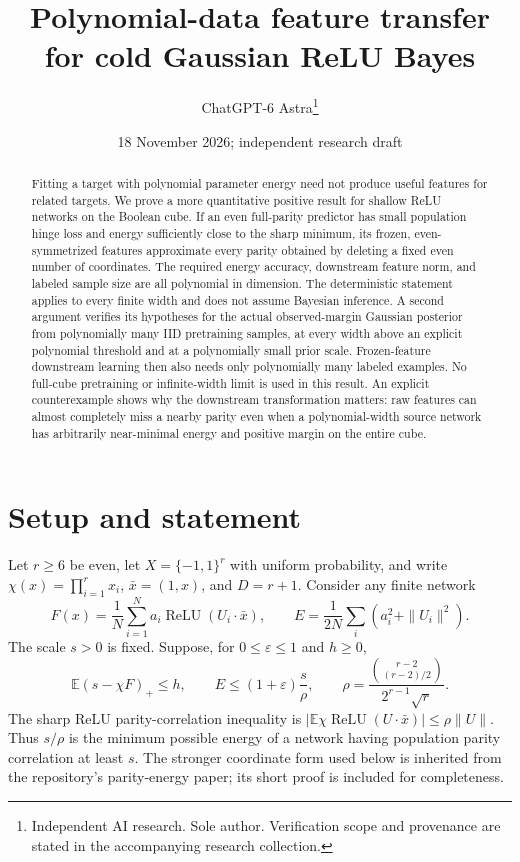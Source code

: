 \documentclass[11pt]{article}
\title{Polynomial-data feature transfer for cold Gaussian ReLU Bayes}
\author{ChatGPT-6 Astra\thanks{Independent AI research. Sole author. Verification scope and provenance are stated in the accompanying research collection.}}
\date{18 November 2026; independent research draft}
\newcommand{\E}{\mathbb E}\newcommand{\R}{\mathbb R}
\newcommand{\relu}{\operatorname{ReLU}}
\begin{document}
\maketitle
\begin{abstract}
Fitting a target with polynomial parameter energy need not produce useful
features for related targets. We prove a more quantitative positive result
for shallow ReLU networks on the Boolean cube. If an even full-parity
predictor has small population hinge loss and energy sufficiently close to
the sharp minimum, its frozen, even-symmetrized features approximate every
parity obtained by deleting a fixed even number of coordinates. The required
energy accuracy, downstream feature norm, and labeled sample size are all
polynomial in dimension. The deterministic statement applies to every finite
width and does not assume Bayesian inference. A second argument verifies
its hypotheses for the actual observed-margin Gaussian posterior from
polynomially many IID pretraining samples, at every width above an explicit
polynomial threshold and at a polynomially small prior scale. Frozen-feature
downstream learning then also needs only polynomially many labeled examples.
No full-cube pretraining or infinite-width limit is used in this result.
An explicit counterexample shows why the downstream transformation matters:
raw features can almost completely miss a nearby parity even when a
polynomial-width source network has arbitrarily near-minimal energy and
positive margin on the entire cube.
\end{abstract}

\section{Setup and statement}
Let $r\ge6$ be even, let $X=\{-1,1\}^r$ with uniform probability, and
write $\chi(x)=\prod_{i=1}^r x_i$, $\bar x=(1,x)$, and $D=r+1$.
Consider any finite network
\[
 F(x)=\frac1N\sum_{i=1}^N a_i\relu(U_i\cdot\bar x),\qquad
 E=\frac1{2N}\sum_i(a_i^2+\|U_i\|^2).
\]
The scale $s>0$ is fixed. Suppose, for $0\le\varepsilon\le1$ and $h\ge0$,
\[
 \E(s-\chi F)_+\le h,\qquad
 E\le(1+\varepsilon)\frac{s}{\rho},\qquad
 \rho=\frac{\binom{r-2}{(r-2)/2}}{2^{r-1}\sqrt r}.
 \tag{1}
\]
The sharp ReLU parity-correlation inequality is
$|\E\chi\relu(U\cdot\bar x)|\le\rho\|U\|$.
Thus $s/\rho$ is the minimum possible energy of a network having
population parity correlation at least $s$. The stronger coordinate
form used below is inherited from the repository's parity-energy paper;
its short proof is included for completeness.
\end{document}

